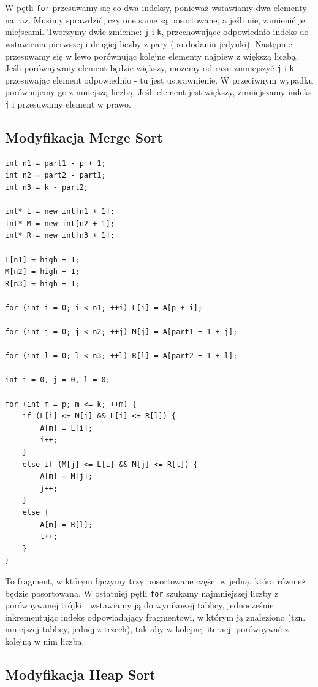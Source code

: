 \documentclass{article}
\begin{document}
W pętli \texttt{for} przesuwamy się co dwa indeksy, ponieważ wstawiamy dwa elementy na raz. Musimy sprawdzić, czy one same są posortowane, a jeśli nie, zamienić je miejscami. Tworzymy dwie zmienne: \texttt{j} i \texttt{k}, przechowujące odpowiednio indeks do wstawienia pierwszej i drugiej liczby z pary (po dodaniu jedynki). Następnie przesuwamy się w lewo porównując kolejne elementy najpiew z większą liczbą. Jeśli porównywany element będzie większy, możemy od razu zmniejszyć \texttt{j} i \texttt{k} przesuwając element odpowiednio - tu jest usprawnienie. W przeciwnym wypadku porównujemy go z mniejszą liczbą. Jeśli element jest większy, zmniejszamy indeks \texttt{j} i przesuwamy element w prawo.

\subsection{Modyfikacja Merge Sort}

\begin{verbatim}
int n1 = part1 - p + 1;
int n2 = part2 - part1;
int n3 = k - part2;

int* L = new int[n1 + 1];
int* M = new int[n2 + 1];
int* R = new int[n3 + 1];

L[n1] = high + 1;
M[n2] = high + 1;
R[n3] = high + 1;

for (int i = 0; i < n1; ++i) L[i] = A[p + i];

for (int j = 0; j < n2; ++j) M[j] = A[part1 + 1 + j];

for (int l = 0; l < n3; ++l) R[l] = A[part2 + 1 + l];

int i = 0, j = 0, l = 0;

for (int m = p; m <= k; ++m) {
    if (L[i] <= M[j] && L[i] <= R[l]) {
        A[m] = L[i];
        i++;
    }
    else if (M[j] <= L[i] && M[j] <= R[l]) {
        A[m] = M[j];
        j++;
    }
    else {
        A[m] = R[l];
        l++;
    }
}
\end{verbatim}

To fragment, w którym łączymy trzy posortowane części w jedną, która również będzie posortowana. W ostatniej pętli \texttt{for} szukamy najmniejszej liczby z porównywanej trójki i wstawiamy ją do wynikowej tablicy, jednocześnie inkrementując indeks odpowiadający fragmentowi, w którym ją znaleziono (tzn. mniejszej tablicy, jednej z trzech), tak aby w kolejnej iteracji porównywać z kolejną w nim liczbą.

\subsection{Modyfikacja Heap Sort}
\end{document}
